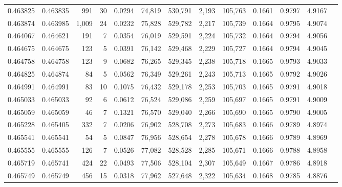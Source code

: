 \begin{tabular}{rrrrrrrrrrrrr}
0.463825 & 0.463835 &   991 &    30 &                                     0.0294 &  74,819 & 530,791 &   2,193 & 105,763 & 0.1661 & 0.9797 & 4.9167 \\
0.463874 & 0.463985 & 1,009 &    24 &                                     0.0232 &  75,828 & 529,782 &   2,217 & 105,739 & 0.1664 & 0.9795 & 4.9074 \\
0.464067 & 0.464621 &   191 &     7 &                                     0.0354 &  76,019 & 529,591 &   2,224 & 105,732 & 0.1664 & 0.9794 & 4.9056 \\
0.464675 & 0.464675 &   123 &     5 &                                     0.0391 &  76,142 & 529,468 &   2,229 & 105,727 & 0.1664 & 0.9794 & 4.9045 \\
0.464758 & 0.464758 &   123 &     9 &                                     0.0682 &  76,265 & 529,345 &   2,238 & 105,718 & 0.1665 & 0.9793 & 4.9033 \\
0.464825 & 0.464874 &    84 &     5 &                                     0.0562 &  76,349 & 529,261 &   2,243 & 105,713 & 0.1665 & 0.9792 & 4.9026 \\
0.464991 & 0.464991 &    83 &    10 &                                     0.1075 &  76,432 & 529,178 &   2,253 & 105,703 & 0.1665 & 0.9791 & 4.9018 \\
0.465033 & 0.465033 &    92 &     6 &                                     0.0612 &  76,524 & 529,086 &   2,259 & 105,697 & 0.1665 & 0.9791 & 4.9009 \\
0.465059 & 0.465059 &    46 &     7 &                                     0.1321 &  76,570 & 529,040 &   2,266 & 105,690 & 0.1665 & 0.9790 & 4.9005 \\
0.465228 & 0.465405 &   332 &     7 &                                     0.0206 &  76,902 & 528,708 &   2,273 & 105,683 & 0.1666 & 0.9789 & 4.8974 \\
0.465541 & 0.465541 &    54 &     5 &                                     0.0847 &  76,956 & 528,654 &   2,278 & 105,678 & 0.1666 & 0.9789 & 4.8969 \\
0.465555 & 0.465555 &   126 &     7 &                                     0.0526 &  77,082 & 528,528 &   2,285 & 105,671 & 0.1666 & 0.9788 & 4.8958 \\
0.465719 & 0.465741 &   424 &    22 &                                     0.0493 &  77,506 & 528,104 &   2,307 & 105,649 & 0.1667 & 0.9786 & 4.8918 \\
0.465749 & 0.465749 &   456 &    15 &                                     0.0318 &  77,962 & 527,648 &   2,322 & 105,634 & 0.1668 & 0.9785 & 4.8876 \\

\end{tabular}
